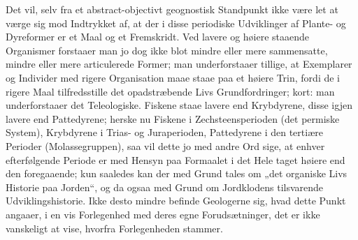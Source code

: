 \documentclass[12pt,a4paper]{book}
\begin{document}
Det vil, selv fra et abstract-objectivt geognostisk Standpunkt ikke være let
at værge sig mod Indtrykket af, at der i disse periodiske Udviklinger af
Plante- og Dyreformer er et Maal og et Fremskridt. Ved lavere og høiere
staaende Organismer forstaaer man jo dog ikke blot mindre eller mere
sammensatte, mindre eller mere articulerede Former; man underforstaaer
tillige, at Exemplarer og Individer med rigere Organisation maae staae paa et
høiere Trin, fordi de i rigere Maal tilfredsstille det opadstræbende Livs
Grundfordringer; kort: man underforstaaer det Teleologiske. Fiskene staae
lavere end Krybdyrene, disse igjen lavere end Pattedyrene; herske nu Fiskene i
Zechsteensperioden (det permiske System), Krybdyrene i Trias- og
Juraperioden, Pattedyrene i den tertiære Perioder (Molassegruppen), saa vil
dette jo med andre Ord sige, at enhver
efterfølgende Periode er med Hensyn paa Formaalet i det Hele taget høiere end
den foregaaende; kun saaledes kan der med Grund tales om „det organiske Livs
Historie paa Jorden“, og da ogsaa med Grund om Jordklodens tilsvarende
Udviklingshistorie. Ikke desto mindre befinde Geologerne sig, hvad dette Punkt
angaaer, i en vis Forlegenhed med deres egne Forudsætninger, det er ikke
vanskeligt at vise, hvorfra Forlegenheden stammer.
\end{document}
